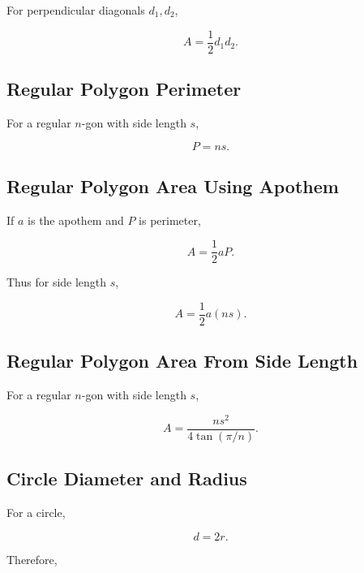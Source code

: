 For perpendicular diagonals \(d_1,d_2\),

\[
\boxed{
A
=
\frac12d_1d_2.
}
\]

\subsection{Regular Polygon Perimeter}
\label{subsec:regular-polygon-perimeter}

For a regular \(n\)-gon with side length \(s\),

\[
\boxed{
P=ns.
}
\]

\subsection{Regular Polygon Area Using Apothem}
\label{subsec:regular-polygon-area-apothem}

If \(a\) is the apothem and \(P\) is perimeter,

\[
\boxed{
A
=
\frac12aP.
}
\]

Thus for side length \(s\),

\[
\boxed{
A
=
\frac12a(ns).
}
\]

\subsection{Regular Polygon Area From Side Length}
\label{subsec:regular-polygon-area-side}

For a regular \(n\)-gon with side length \(s\),

\[
\boxed{
A
=
\frac{
ns^2
}{
4\tan(\pi/n)
}.
}
\]

\subsection{Circle Diameter and Radius}
\label{subsec:circle-radius-diameter}

For a circle,

\[
\boxed{
d=2r.
}
\]

Therefore,

